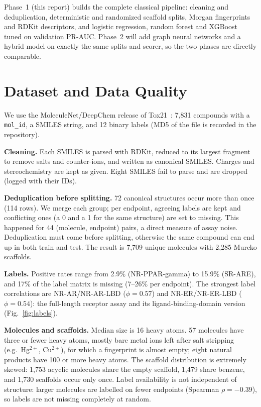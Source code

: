 \documentclass[conference]{IEEEtran}
\begin{document}
Phase~1 (this report) builds the complete classical pipeline: cleaning and deduplication, deterministic and randomized scaffold splits, Morgan fingerprints and RDKit descriptors, and logistic regression, random forest and XGBoost tuned on validation PR-AUC. Phase~2 will add graph neural networks and a hybrid model on exactly the same splits and scorer, so the two phases are directly comparable.



\section{Dataset and Data Quality}
We use the MoleculeNet/DeepChem release of Tox21~\cite{wu2018moleculenet}: 7{,}831 compounds with a \texttt{mol\_id}, a SMILES string, and 12 binary labels (MD5 of the file is recorded in the repository).

\textbf{Cleaning.} Each SMILES is parsed with RDKit, reduced to its largest fragment to remove salts and counter-ions, and written as canonical SMILES. Charges and stereochemistry are kept as given. Eight SMILES fail to parse and are dropped (logged with their IDs).

\textbf{Deduplication before splitting.} 72 canonical structures occur more than once (114 rows). We merge each group; per endpoint, agreeing labels are kept and conflicting ones (a 0 and a 1 for the same structure) are set to missing. This happened for 44 (molecule, endpoint) pairs, a direct measure of assay noise. Deduplication must come before splitting, otherwise the same compound can end up in both train and test. The result is 7{,}709 unique molecules with 2{,}285 Murcko scaffolds.

\textbf{Labels.} Positive rates range from 2.9\% (NR-PPAR-gamma) to 15.9\% (SR-ARE), and 17\% of the label matrix is missing (7--26\% per endpoint). The strongest label correlations are NR-AR/NR-AR-LBD ($\phi=0.57$) and NR-ER/NR-ER-LBD ($\phi=0.54$): the full-length receptor assay and its ligand-binding-domain version (Fig.~\ref{fig:labels}).

\textbf{Molecules and scaffolds.} Median size is 16 heavy atoms. 57 molecules have three or fewer heavy atoms, mostly bare metal ions left after salt stripping (e.g.\ Hg$^{2+}$, Cu$^{2+}$), for which a fingerprint is almost empty; eight natural products have 100 or more heavy atoms. The scaffold distribution is extremely skewed: 1{,}753 acyclic molecules share the empty scaffold, 1{,}479 share benzene, and 1{,}730 scaffolds occur only once. Label availability is not independent of structure: larger molecules are labelled on fewer endpoints (Spearman $\rho=-0.39$), so labels are not missing completely at random.
\end{document}
